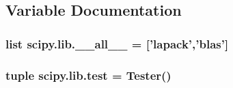 \subsection{Variable Documentation}
\hypertarget{namespacescipy_1_1lib_a32d465836b84be516f414d054bdf2745}{}
\subsubsection[{\+\_\+\+\_\+all\+\_\+\+\_\+}]{\setlength{\rightskip}{0pt plus 5cm}list scipy.\+lib.\+\_\+\+\_\+all\+\_\+\+\_\+ = \mbox{[}'lapack','blas'\mbox{]}}\label{namespacescipy_1_1lib_a32d465836b84be516f414d054bdf2745}
\hypertarget{namespacescipy_1_1lib_a675252b0c93dc0d6ab96541d2bf65291}{}
\subsubsection[{test}]{\setlength{\rightskip}{0pt plus 5cm}tuple scipy.\+lib.\+test = Tester()}\label{namespacescipy_1_1lib_a675252b0c93dc0d6ab96541d2bf65291}
